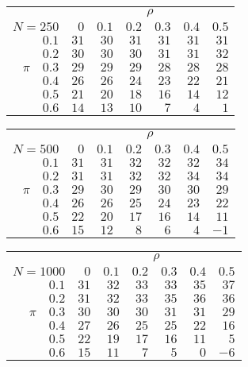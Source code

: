 \begin{tabular}{r|rrrrrr}
\hline\hline
 &\multicolumn{6}{c}{$\rho$} \\ 
 $N = 250$ & $0$ & $0.1$ & $0.2$ & $0.3$ & $0.4$ & $0.5$ \\ 
 \hline$0.1$ & $31$ & $30$ & $31$ & $31$ & $31$ & $31$\\ 
$0.2$ & $30$ & $30$ & $30$ & $31$ & $31$ & $32$\\ 
$\pi\quad$$0.3$ & $29$ & $29$ & $29$ & $28$ & $28$ & $28$\\ 
$0.4$ & $26$ & $26$ & $24$ & $23$ & $22$ & $21$\\ 
$0.5$ & $21$ & $20$ & $18$ & $16$ & $14$ & $12$\\ 
$0.6$ & $14$ & $13$ & $10$ & $7$ & $4$ & $1$\\ 
 \hline 
 \end{tabular}
 
 \vspace{2em} 
 
\begin{tabular}{r|rrrrrr}
\hline\hline
 &\multicolumn{6}{c}{$\rho$} \\ 
 $N = 500$ & $0$ & $0.1$ & $0.2$ & $0.3$ & $0.4$ & $0.5$ \\ 
 \hline$0.1$ & $31$ & $31$ & $32$ & $32$ & $32$ & $34$\\ 
$0.2$ & $31$ & $31$ & $32$ & $32$ & $34$ & $34$\\ 
$\pi\quad$$0.3$ & $29$ & $30$ & $29$ & $30$ & $30$ & $29$\\ 
$0.4$ & $26$ & $26$ & $25$ & $24$ & $23$ & $22$\\ 
$0.5$ & $22$ & $20$ & $17$ & $16$ & $14$ & $11$\\ 
$0.6$ & $15$ & $12$ & $8$ & $6$ & $4$ & $-1$\\ 
 \hline 
 \end{tabular}
 
 \vspace{2em} 
 
\begin{tabular}{r|rrrrrr}
\hline\hline
 &\multicolumn{6}{c}{$\rho$} \\ 
 $N = 1000$ & $0$ & $0.1$ & $0.2$ & $0.3$ & $0.4$ & $0.5$ \\ 
 \hline$0.1$ & $31$ & $32$ & $33$ & $33$ & $35$ & $37$\\ 
$0.2$ & $31$ & $32$ & $33$ & $35$ & $36$ & $36$\\ 
$\pi\quad$$0.3$ & $30$ & $30$ & $30$ & $31$ & $31$ & $29$\\ 
$0.4$ & $27$ & $26$ & $25$ & $25$ & $22$ & $16$\\ 
$0.5$ & $22$ & $19$ & $17$ & $16$ & $11$ & $5$\\ 
$0.6$ & $15$ & $11$ & $7$ & $5$ & $0$ & $-6$\\ 
 \hline 
 \end{tabular}
